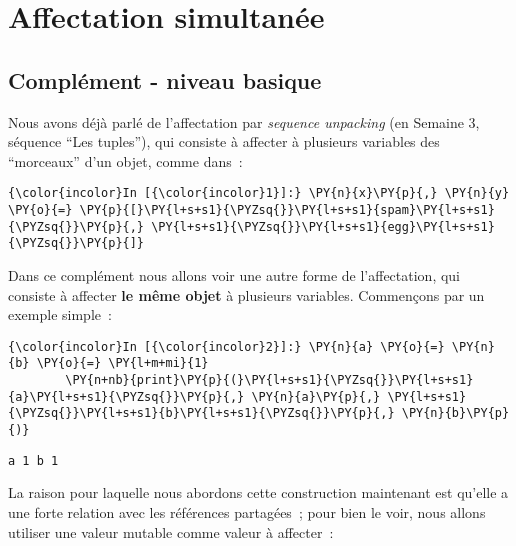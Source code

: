     
    
    
    

    

    \hypertarget{affectation-simultanuxe9e}{%
\section{Affectation simultanée}\label{affectation-simultanuxe9e}}

    \hypertarget{compluxe9ment---niveau-basique}{%
\subsection{Complément - niveau
basique}\label{compluxe9ment---niveau-basique}}

    Nous avons déjà parlé de l'affectation par \emph{sequence unpacking} (en
Semaine 3, séquence ``Les tuples''), qui consiste à affecter à plusieurs
variables des ``morceaux'' d'un objet, comme dans~:

    \begin{Verbatim}[commandchars=\\\{\}]
{\color{incolor}In [{\color{incolor}1}]:} \PY{n}{x}\PY{p}{,} \PY{n}{y} \PY{o}{=} \PY{p}{[}\PY{l+s+s1}{\PYZsq{}}\PY{l+s+s1}{spam}\PY{l+s+s1}{\PYZsq{}}\PY{p}{,} \PY{l+s+s1}{\PYZsq{}}\PY{l+s+s1}{egg}\PY{l+s+s1}{\PYZsq{}}\PY{p}{]}
\end{Verbatim}


    Dans ce complément nous allons voir une autre forme de l'affectation,
qui consiste à affecter \textbf{le même objet} à plusieurs variables.
Commençons par un exemple simple~:

    \begin{Verbatim}[commandchars=\\\{\}]
{\color{incolor}In [{\color{incolor}2}]:} \PY{n}{a} \PY{o}{=} \PY{n}{b} \PY{o}{=} \PY{l+m+mi}{1}
        \PY{n+nb}{print}\PY{p}{(}\PY{l+s+s1}{\PYZsq{}}\PY{l+s+s1}{a}\PY{l+s+s1}{\PYZsq{}}\PY{p}{,} \PY{n}{a}\PY{p}{,} \PY{l+s+s1}{\PYZsq{}}\PY{l+s+s1}{b}\PY{l+s+s1}{\PYZsq{}}\PY{p}{,} \PY{n}{b}\PY{p}{)}
\end{Verbatim}


    \begin{Verbatim}[commandchars=\\\{\}]
a 1 b 1

    \end{Verbatim}

    La raison pour laquelle nous abordons cette construction maintenant est
qu'elle a une forte relation avec les références partagées~; pour bien
le voir, nous allons utiliser une valeur mutable comme valeur à
affecter~:

